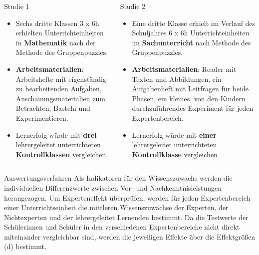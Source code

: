 \begin{columns}[t,totalwidth=\twocolwid] %
\begin{column}{\onecolwid}\vspace{-.6in} %
\begin{block}{Studie 1}
\begin{itemize}
\justifying
\item Sechs dritte Klassen 3 x 6h erhielten Unterrichteinheiten in \textbf{Mathematik} nach der Methode des Gruppenpuzzles.
\item \textbf{Arbeitsmaterialien}: Arbeitshefte mit eigenständig zu bearbeitenden Aufgaben, Anschauungsmaterialien zum Betrachten, Basteln und Experimentieren.
\item Lernerfolg würde mit \textbf{drei} lehrergeleitet unterrichteten \textbf{Kontrollklassen} vergleichen.
\end{itemize}
\end{block}
\end{column} %
\begin{column}{\onecolwid}\vspace{-.6in} %
\begin{block}{Studie 2}
\begin{itemize}
\justifying
\item Eine dritte Klasse erhielt im Verlauf des Schuljahres 6 x 6h Unterrichteinheiten im \textbf{Sachunterricht} nach Methode des Gruppenpuzzles. 
\item \textbf{Arbeitsmaterialien}: Reader mit Texten und Abbildungen, ein Aufgabenheft mit Leitfragen für beide Phasen, ein kleines, von den Kindern durchzuführendes  Experiment für jeden Expertenbereich.
\item Lernerfolg würde mit \textbf{einer} lehrergeleitet unterrichteten \textbf{Kontrollklasse} vergleichen
\end{itemize}
\end{block}
\end{column} %
\end{columns} %

\begin{block}{Auswertungsverfahren}
Als Indikatoren für den Wissenszuwachs werden die individuellen Differenzwerte zwischen Vor- und Nachkenntnisleistungen herangezogen. Um Experteneffekt überprüfen, werden für jeden Expertenbereich einer Unterrichtseinheit die mittleren Wissenszuwächse der Experten, der Nichtexperten und der lehrergeleitet Lernenden bestimmt. Da die Testwerte der Schülerinnen und Schüler in den verschiedenen Expertenbereiche nicht direkt miteinander vergleichbar sind, werden die jeweiligen Effekte über die Effektgrößen (d) bestimmt.
\end{block} 

